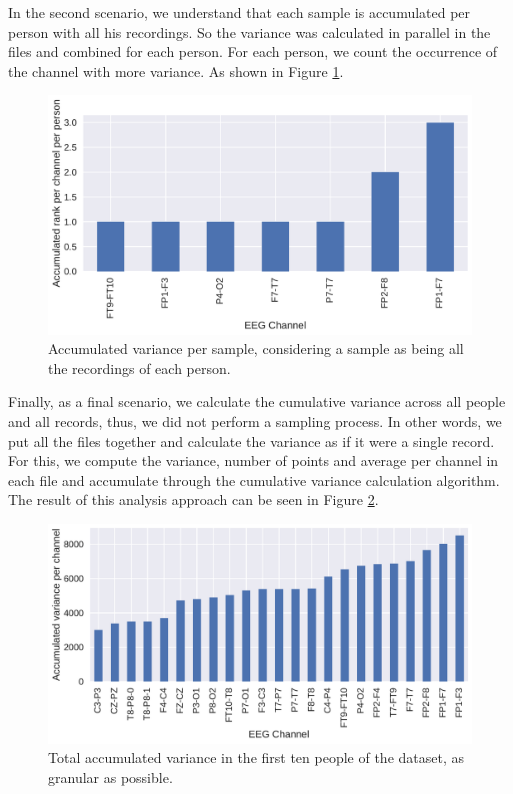 In the second scenario, we understand that each sample is accumulated per person with all his recordings. So the variance was calculated in parallel in the files and combined for each person. For each person, we count the occurrence of the channel with more variance. As shown in Figure \ref{fig:variance_per_person}.


\begin{figure}[!ht]
    \centering
    \includegraphics[width=\linewidth]{figure/variance_per_person.pdf}
    \caption{Accumulated variance per sample, considering a sample as being all the recordings of each person.}
    \label{fig:variance_per_person}
\end{figure}



Finally, as a final scenario, we calculate the cumulative variance across all people and all records, thus, we did not perform a sampling process. In other words, we put all the files together and calculate the variance as if it were a single record. For this, we compute the variance, number of points and average per channel in each file and accumulate through the cumulative variance calculation algorithm. The result of this analysis approach can be seen in Figure \ref{fig:variance_all_files}.


\begin{figure}[!ht]
    \centering
    \includegraphics[width=\linewidth]{figure/variance_all.pdf}
    \caption{Total accumulated variance in the first ten people of the dataset, as granular as possible.}
\label{fig:variance_all_files}
\end{figure}


